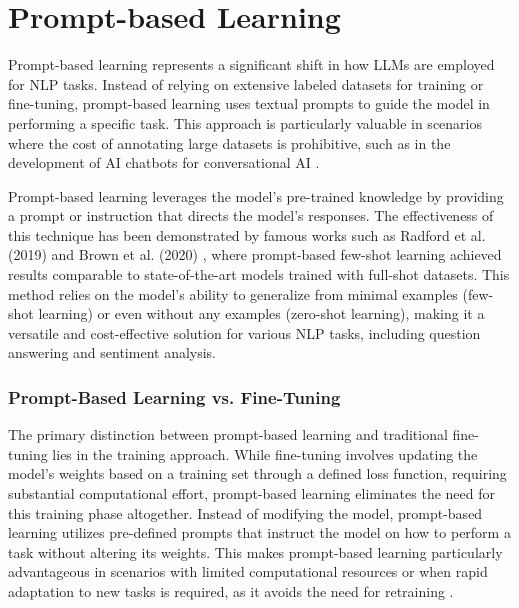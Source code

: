 \section{Prompt-based Learning}

Prompt-based learning represents a significant shift in how LLMs are employed for NLP tasks. Instead of relying on extensive labeled datasets for training or fine-tuning, prompt-based learning uses textual prompts to guide the model in performing a specific task. This approach is particularly valuable in scenarios where the cost of annotating large datasets is prohibitive, such as in the development of AI chatbots for conversational AI \cite{madotto2021few}.

Prompt-based learning leverages the model's pre-trained knowledge by providing a prompt or instruction that directs the model's responses. The effectiveness of this technique has been demonstrated by famous works such as Radford et al. (2019) \cite{radford2019language} and Brown et al. (2020) \cite{brown2020language}, where prompt-based few-shot learning achieved results comparable to state-of-the-art models trained with full-shot datasets. This method relies on the model's ability to generalize from minimal examples (few-shot learning) or even without any examples (zero-shot learning), making it a versatile and cost-effective solution for various NLP tasks, including question answering and sentiment analysis.

\subsubsection{Prompt-Based Learning vs. Fine-Tuning}

The primary distinction between prompt-based learning and traditional fine-tuning lies in the training approach. While fine-tuning involves updating the model's weights based on a training set through a defined loss function, requiring substantial computational effort, prompt-based learning eliminates the need for this training phase altogether. Instead of modifying the model, prompt-based learning utilizes pre-defined prompts that instruct the model on how to perform a task without altering its weights. This makes prompt-based learning particularly advantageous in scenarios with limited computational resources or when rapid adaptation to new tasks is required, as it avoids the need for retraining \cite{madotto2021few}. 


